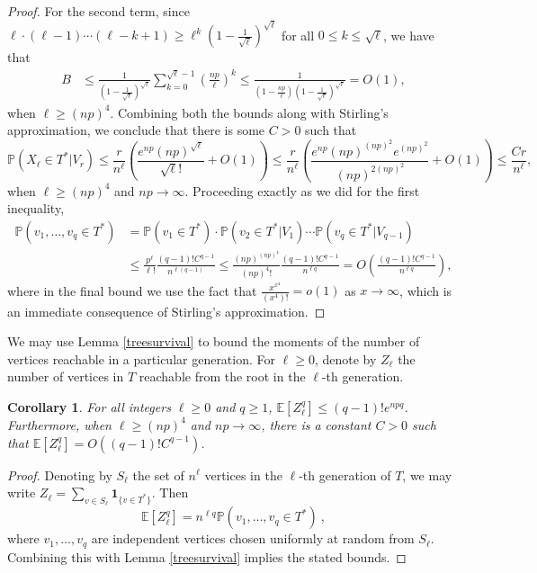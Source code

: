 \documentclass[11pt]{article}
\newtheorem{corollary}[theorem]{Corollary}
\newcommand{\1}{\mathbf{1}} %
\newcommand{\prob}{\mathbb{P}} %
\newcommand{\ex}{\mathbb{E}} %
\begin{document}
\begin{proof}
For the second term, since $\ell \cdot (\ell-1) \cdots (\ell - k + 1) \geq \ell^{k}(1-\frac{1}{\sqrt{\ell}})^{\sqrt{\ell}}$ for all $0 \leq k \leq \sqrt{\ell}$, we have that
\begin{align*}
    B &\leq \frac{1}{\left(1-\frac{1}{\sqrt{\ell}}\right)^{\sqrt{\ell}}}\sum_{k=0}^{\sqrt{\ell}-1} \left(\frac{np}{\ell}\right)^k \leq \frac{1}{\left(1-\frac{np}{\ell}\right)\left(1-\frac{1}{\sqrt{\ell}}\right)^{\sqrt{\ell}}} = O(1),
\end{align*}
when $\ell \geq (np)^4$. Combining both the bounds along with Stirling's approximation, we conclude that there is some $C > 0$ such that
$$
\prob(X_\ell \in T^* | V_r) 
\leq \frac{r}{n^\ell}\left(\frac{e^{np}(np)^{\sqrt{\ell}}}{\sqrt{\ell}!} + O(1)\right) \leq \frac{r}{n^\ell}\left(\frac{e^{np}(np)^{(np)^2}e^{(np)^2}}{(np)^{2(np)^2}}+O(1)\right) \leq \frac{Cr}{n^\ell},$$
when $\ell \geq (np)^4$ and $np \to \infty$. Proceeding exactly as we did for the first inequality,
\begin{align*}
\prob(v_1,\ldots,v_q \in T^*) &= \prob(v_1 \in T^*) \cdot \prob(v_2 \in T^* | V_1) \cdots \prob(v_q \in T^* | V_{q-1}) \\
&\leq \frac{p^\ell}{\ell!}\frac{(q-1)!C^{q-1}}{n^{\ell (q-1)}} \leq \frac{(np)^{(np)^4}}{(np)^4!}\frac{(q-1)!C^{q-1}}{n^{\ell q}} = O\left( \frac{(q-1)!C^{q-1}}{n^{\ell q}}\right),
\end{align*} 
where in the final bound we use the fact that $\frac{x^{x^4}}{(x^4)!} = o(1)$ as $x\to \infty$, which is an immediate consequence of Stirling's approximation.
\end{proof}

We may use Lemma \ref{treesurvival} to bound the moments of the number of vertices reachable in a particular generation. For $\ell \geq 0$, denote by $Z_\ell$ the number of vertices in $T$ reachable from the root in the $\ell$-th generation. 

\begin{corollary}\label{reversejensen}
For all integers $\ell \ge 0$ and $q \ge 1$,
$\ex[Z_\ell^q] \leq (q -1)!e^{npq}$. Furthermore, when $\ell \geq (np)^4$ and $np \to \infty$, there is a constant $C > 0$ such that $\ex[Z_\ell^q] = O((q-1)!C^{q-1})$.
\end{corollary}


\begin{proof}
Denoting by $S_\ell$ the set of $n^{\ell}$ vertices in the $\ell$-th generation of $T$, we may write
$Z_\ell = \sum_{v\in S_{\ell}} \mathbf{1}_{\{v\in T^*\}}$. Then
\[
  \ex [Z_\ell^q] = n^{\ell q}\prob( v_1,\ldots,v_q \in T^*)~,
\]
where $v_1,\ldots,v_q$ are independent vertices chosen uniformly at random from $S_\ell$.
Combining this with Lemma \ref{treesurvival} implies the stated bounds.
\end{proof}
\end{document}
